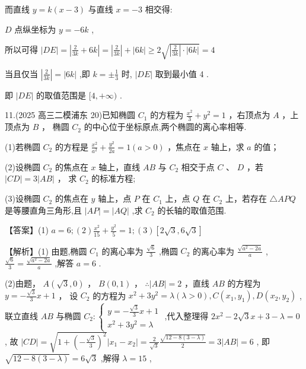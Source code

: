 \documentclass[10pt]{article}
\begin{document}
而直线 \(y = k\left( {x - 3}\right)\) 与直线 \(x =  - 3\) 相交得:

\(D\) 点纵坐标为 \(y =  - {6k}\) ,

所以可得 \(\left| {DE}\right|  = \left| {\frac{2}{3k} + {6k}}\right|  = \left| \frac{2}{3k}\right|  + \left| {6k}\right|  \geq  2\sqrt{\left| \frac{2}{3k}\right|  \cdot  \left| {6k}\right| } = 4\)

当且仅当 \(\left| \frac{2}{3k}\right|  = \left| {6k}\right|\) ,即 \(k =  \pm  \frac{1}{3}\) 时, \(\left| {DE}\right|\) 取到最小值 4 .

即 \(\left| {DE}\right|\) 的取值范围是 \(\lbrack 4, + \infty )\) .

11.(2025 高三二模浦东 20)已知椭圆 \({C}_{1}\) 的方程为 \(\frac{{x}^{2}}{3} + {y}^{2} = 1\) ，右顶点为 \(A\) ，上顶点为 \(B\) ， 椭圆 \({C}_{2}\) 的中心位于坐标原点,两个椭圆的离心率相等.

(1)若椭圆 \({C}_{2}\) 的方程是 \(\frac{{x}^{2}}{{a}^{2}} + \frac{{y}^{2}}{2a} = 1\left( {a > 0}\right)\) ，焦点在 \(x\) 轴上，求 \(a\) 的值；

(2)设椭圆 \({C}_{2}\) 的焦点在 \(x\) 轴上，直线 \({AB}\) 与 \({C}_{2}\) 相交于点 \(C\text{ 、 }D\) ，若 \(\left| {CD}\right|  = 3\left| {AB}\right|\) ， 求 \({C}_{2}\) 的标准方程;

(3)设椭圆 \({C}_{2}\) 的焦点在 \(y\) 轴上，点 \(P\) 在 \({C}_{1}\) 上，点 \(Q\) 在 \({C}_{2}\) 上，若存在 \(\bigtriangleup  {APQ}\) 是等腰直角三角形,且 \(\left| {AP}\right|  = \left| {AQ}\right|\) ,求 \({C}_{2}\) 的长轴的取值范围.

【答案】(1) \(a = 6;\left( 2\right) \frac{{x}^{2}}{15} + \frac{{y}^{2}}{5} = 1;\left( 3\right) \left\lbrack  {2\sqrt{3},6\sqrt{3}}\right\rbrack\)

【解析】(1) 由题,椭圆 \({C}_{1}\) 的离心率为 \(\frac{\sqrt{6}}{3}\) ,椭圆 \({C}_{2}\) 的离心率为 \(\frac{\sqrt{{a}^{2} - {2a}}}{a}\) , \(\frac{\sqrt{6}}{3} = \frac{\sqrt{{a}^{2} - {2a}}}{a}\) ,解答 \(a = 6\) .

(2)由题， \(A\left( {\sqrt{3},0}\right)\) ， \(B\left( {0,1}\right)\) ， \(\therefore \left| {AB}\right|  = 2\) ，直线 \({AB}\) 的方程为 \(y =  - \frac{\sqrt{3}}{3}x + 1\) ， 设 \({C}_{2}\) 的方程为 \({x}^{2} + 3{y}^{2} = \lambda \left( {\lambda  > 0}\right) ,C\left( {{x}_{1},{y}_{1}}\right) ,D\left( {{x}_{2},{y}_{2}}\right)\) , 联立直线 \({AB}\) 与椭圆 \({C}_{2} : \left\{  \begin{array}{l} y =  - \frac{\sqrt{3}}{3}x + 1 \\  {x}^{2} + 3{y}^{2} = \lambda  \end{array}\right.\) ,代入整理得 \(2{x}^{2} - 2\sqrt{3}x + 3 - \lambda  = 0\) , 故 \(\left| {CD}\right|  = \sqrt{1 + {\left( -\frac{\sqrt{3}}{3}\right) }^{2}}\left| {{x}_{1} - {x}_{2}}\right|  = \frac{2}{\sqrt{3}}\frac{\sqrt{{12} - 8\left( {3 - \lambda }\right) }}{2} = 3\left| {AB}\right|  = 6\) , 即 \(\sqrt{{12} - 8\left( {3 - \lambda }\right) } = 6\sqrt{3}\) ,解得 \(\lambda  = {15}\) ,
\end{document}
